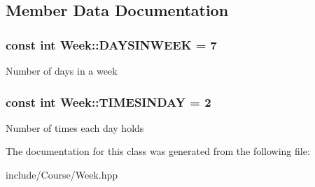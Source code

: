 \subsection{Member Data Documentation}
\hypertarget{class_week_af8d4a24feca81c4df65ca8d41ea47532}{}
\subsubsection[{D\+A\+Y\+S\+I\+N\+W\+E\+E\+K}]{\setlength{\rightskip}{0pt plus 5cm}const int Week\+::\+D\+A\+Y\+S\+I\+N\+W\+E\+E\+K = 7\hspace{0.3cm}{\ttfamily [static]}}\label{class_week_af8d4a24feca81c4df65ca8d41ea47532}
Number of days in a week \hypertarget{class_week_a6bfc795b71dfa867a36606978645e0c2}{}
\subsubsection[{T\+I\+M\+E\+S\+I\+N\+D\+A\+Y}]{\setlength{\rightskip}{0pt plus 5cm}const int Week\+::\+T\+I\+M\+E\+S\+I\+N\+D\+A\+Y = 2\hspace{0.3cm}{\ttfamily [static]}}\label{class_week_a6bfc795b71dfa867a36606978645e0c2}
Number of times each day holds 

The documentation for this class was generated from the following file\+:\begin{DoxyCompactItemize}
\item 
include/\+Course/Week.\+hpp\end{DoxyCompactItemize}
